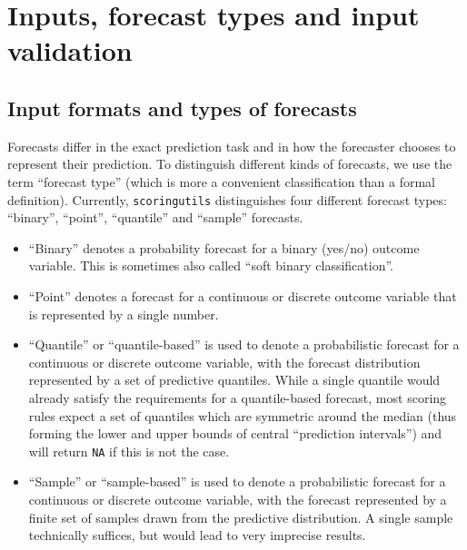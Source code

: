 \documentclass[
]{jss}
\providecommand{\tightlist}{%
  \setlength{\itemsep}{0pt}\setlength{\parskip}{0pt}}
\begin{document}
\section{Inputs, forecast types and input validation} \label{sec:inputs}

\subsection{Input formats and types of
forecasts}\label{input-formats-and-types-of-forecasts}

Forecasts differ in the exact prediction task and in how the forecaster
chooses to represent their prediction. To distinguish different kinds of
forecasts, we use the term ``forecast type'' (which is more a convenient
classification than a formal definition). Currently,
\texttt{scoringutils} distinguishes four different forecast types:
``binary'', ``point'', ``quantile'' and ``sample'' forecasts.

\begin{itemize}
\tightlist
\item
  ``Binary'' denotes a probability forecast for a binary (yes/no)
  outcome variable. This is sometimes also called ``soft binary
  classification''.
\item
  ``Point'' denotes a forecast for a continuous or discrete outcome
  variable that is represented by a single number.
\item
  ``Quantile'' or ``quantile-based'' is used to denote a probabilistic
  forecast for a continuous or discrete outcome variable, with the
  forecast distribution represented by a set of predictive quantiles.
  While a single quantile would already satisfy the requirements for a
  quantile-based forecast, most scoring rules expect a set of quantiles
  which are symmetric around the median (thus forming the lower and
  upper bounds of central ``prediction intervals'') and will return
  \texttt{NA} if this is not the case.
\item
  ``Sample'' or ``sample-based'' is used to denote a probabilistic
  forecast for a continuous or discrete outcome variable, with the
  forecast represented by a finite set of samples drawn from the
  predictive distribution. A single sample technically suffices, but
  would lead to very imprecise results.
\end{itemize}
\end{document}
